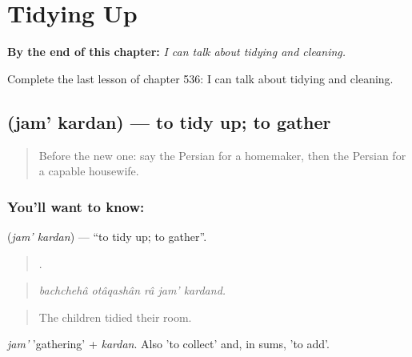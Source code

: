 
\chapter{Tidying Up}
\label{ch:fa-tidying-up}

\begin{chapteropening}
\textbf{By the end of this chapter:} \emph{I can talk about tidying and cleaning.}

Complete the last lesson of chapter 536: I can talk about tidying and cleaning.
\end{chapteropening}

\section[\texorpdfstring{\fa{جمع} \fa{کردن} (jam' kardan)}{جمع کردن (jam' kardan)}]{  (jam' kardan) — to tidy up; to gather}

\label{lesson:FA-C536-jam-kardan}



\begin{quote}
Before the new one: say the Persian for a homemaker, then the Persian for a capable housewife.
\end{quote}

\subsection*{You'll want to know:  }
\textbf{ } (\emph{jam' kardan}) — \textquotedblleft{}to tidy up; to gather\textquotedblright{}.

\begin{quote}
     .
\end{quote}

\begin{quote}
\emph{bachchehâ otâqashân râ jam' kardand.}
\end{quote}

\begin{quote}
The children tidied their room.
\end{quote}

\emph{jam'} 'gathering' + \emph{kardan}. Also 'to collect' and, in sums, 'to add'.

